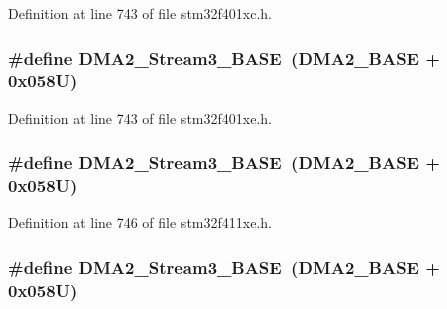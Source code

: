 Definition at line 743 of file stm32f401xc.\+h.

\subsubsection[{\texorpdfstring{D\+M\+A2\+\_\+\+Stream3\+\_\+\+B\+A\+SE}{DMA2_Stream3_BASE}}]{\setlength{\rightskip}{0pt plus 5cm}\#define D\+M\+A2\+\_\+\+Stream3\+\_\+\+B\+A\+SE~({\bf D\+M\+A2\+\_\+\+B\+A\+SE} + 0x058\+U)}\hypertarget{group___peripheral__registers__structures_gaf3a9480e08c6ae94f4482e0cdaebdd17}{}\label{group___peripheral__registers__structures_gaf3a9480e08c6ae94f4482e0cdaebdd17}


Definition at line 743 of file stm32f401xe.\+h.

\subsubsection[{\texorpdfstring{D\+M\+A2\+\_\+\+Stream3\+\_\+\+B\+A\+SE}{DMA2_Stream3_BASE}}]{\setlength{\rightskip}{0pt plus 5cm}\#define D\+M\+A2\+\_\+\+Stream3\+\_\+\+B\+A\+SE~({\bf D\+M\+A2\+\_\+\+B\+A\+SE} + 0x058\+U)}\hypertarget{group___peripheral__registers__structures_gaf3a9480e08c6ae94f4482e0cdaebdd17}{}\label{group___peripheral__registers__structures_gaf3a9480e08c6ae94f4482e0cdaebdd17}


Definition at line 746 of file stm32f411xe.\+h.

\subsubsection[{\texorpdfstring{D\+M\+A2\+\_\+\+Stream3\+\_\+\+B\+A\+SE}{DMA2_Stream3_BASE}}]{\setlength{\rightskip}{0pt plus 5cm}\#define D\+M\+A2\+\_\+\+Stream3\+\_\+\+B\+A\+SE~({\bf D\+M\+A2\+\_\+\+B\+A\+SE} + 0x058\+U)}\hypertarget{group___peripheral__registers__structures_gaf3a9480e08c6ae94f4482e0cdaebdd17}{}\label{group___peripheral__registers__structures_gaf3a9480e08c6ae94f4482e0cdaebdd17}


